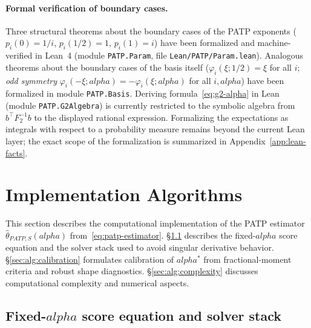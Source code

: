 \documentclass[11pt]{article}
\def\alpha{alpha}%
\def\vec#1{#1}%
\def\mathbf#1{#1}%
\def\mathrm#1{#1}%
\theoremstyle{definition}
\newcommand{\PATP}{\mathrm{PATP}}
\begin{document}
\paragraph{Formal verification of boundary cases.}
Three structural theorems about the boundary cases of the PATP exponents
($p_i(0) = 1/i$, $p_i(1/2) = 1$, $p_i(1) = i$) have been formalized and
machine-verified in Lean~4 (module \texttt{PATP.Param},
file \texttt{Lean/PATP/Param.lean}). Analogous theorems about the boundary
cases of the basis itself ($\varphi_i(\xi; 1/2) = \xi$ for all $i$;
\emph{odd symmetry} $\varphi_i(-\xi; \alpha) = -\varphi_i(\xi; \alpha)$
for all $i, \alpha$) have been formalized in module \texttt{PATP.Basis}.
Deriving formula~\eqref{eq:g2-alpha} in Lean (module
\texttt{PATP.G2Algebra}) is currently restricted to the symbolic algebra
from $\vec b^{\top}\mathbf F_2^{-1}\vec b$ to the displayed rational
expression. Formalizing the expectations as integrals with respect to a
probability measure remains beyond the current Lean layer; the exact scope
of the formalization is summarized in Appendix~\ref{app:lean-facts}.


\section{Implementation Algorithms}\label{sec:algorithms}

This section describes the computational implementation of the PATP estimator
$\hat\theta_{\PATP,S}(\alpha)$ from~\eqref{eq:patp-estimator}.
\S\ref{sec:alg:nr} describes the fixed-$\alpha$ score equation and the
solver stack used to avoid singular derivative behavior. \S\ref{sec:alg:calibration}
formulates calibration of $\alpha^{*}$ from fractional-moment criteria and
robust shape diagnostics. \S\ref{sec:alg:complexity} discusses computational
complexity and numerical aspects.

\subsection[Fixed-alpha score equation and solver stack]{Fixed-$\alpha$ score equation and solver stack}\label{sec:alg:nr}
\end{document}
